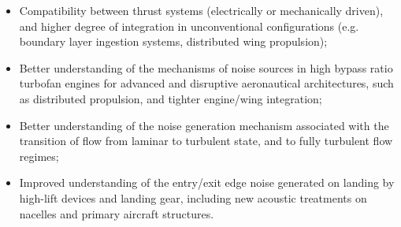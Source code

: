 \documentclass[a5paper]{sapthesis}
\begin{document}
	\begin{itemize}%
		\item
		Compatibility between thrust systems (electrically or mechanically driven), and higher degree of
		integration in unconventional configurations (e.g. boundary layer ingestion systems, distributed wing propulsion);
		\item 
		Better understanding of the mechanisms of noise sources in high bypass ratio turbofan engines for advanced and disruptive aeronautical architectures, such as distributed propulsion, and tighter engine/wing integration;
		\item 
		Better understanding of the noise generation mechanism associated with the transition of flow from laminar to turbulent state, and to fully turbulent flow regimes;
		\item 
		Improved understanding of the entry/exit edge noise generated on landing by high-lift devices and landing gear, including new acoustic treatments on nacelles and primary aircraft structures.
	\end{itemize}
	
\end{document}
